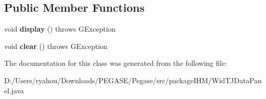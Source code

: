 \subsection*{Public Member Functions}
\begin{DoxyCompactItemize}
\item 
\mbox{\label{classpackage_i_h_m_1_1_wid_t_j_data_panel_a196f1506c0a1eea9fe4cda66f06fdd39}} 
void {\bfseries display} ()  throws G\+Exception 
\item 
\mbox{\label{classpackage_i_h_m_1_1_wid_t_j_data_panel_af9153dbc9641aff60cc5879b64d294ec}} 
void {\bfseries clear} ()  throws G\+Exception 
\end{DoxyCompactItemize}


The documentation for this class was generated from the following file\+:\begin{DoxyCompactItemize}
\item 
D\+:/\+Users/ryahou/\+Downloads/\+P\+E\+G\+A\+S\+E/\+Pegase/src/package\+I\+H\+M/Wid\+T\+J\+Data\+Panel.\+java\end{DoxyCompactItemize}
